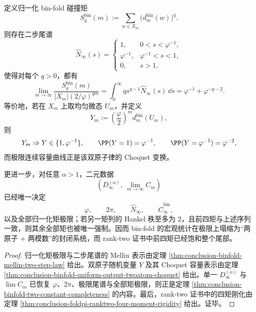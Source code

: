 \begin{theorem}\label{thm:conclusion-binfold-twoatom-macro-closure-fourmoment}
定义归一化 bin-fold 碰撞矩
\[
S_q^{\mathrm{bin}}(m):=\sum_{w\in X_m}\bigl(d_m^{\mathrm{bin}}(w)\bigr)^q.
\]
则存在二步尾谱
\[
\widehat N_\infty(s)=
\begin{cases}
1,&0<s<\varphi^{-1},\\
\varphi^{-1},&\varphi^{-1}<s<1,\\
0,&s>1,
\end{cases}
\]
使得对每个 \(q>0\)，都有
\[
\lim_{m\to\infty}\frac{S_q^{\mathrm{bin}}(m)}{|X_m|(2/\varphi)^{qm}}
=
\int_0^\infty q s^{q-1}\widehat N_\infty(s)\,\dd s
=
\varphi^{-1}+\varphi^{-q-2}.
\]
等价地，若在 \(X_m\) 上取均匀微态 \(U_m\)，并定义
\[
Y_m:=\left(\frac{\varphi}{2}\right)^m d_m^{\mathrm{bin}}(U_m),
\]
则
\[
Y_m\Rightarrow Y\in\{1,\varphi^{-1}\},
\qquad
\PP(Y=1)=\varphi^{-1},
\qquad
\PP(Y=\varphi^{-1})=\varphi^{-2},
\]
而极限连续容量曲线正是该双原子律的 Choquet 变换。

更进一步，对任意 \(\alpha>1\)，二元数据
\[
\left(D_\infty^{(\alpha)},\ \lim_{m\to\infty}C_m\right)
\]
已经唯一决定
\[
\varphi,\qquad 2\pi,\qquad \widehat N_\infty,\qquad \widehat C_\infty^{\mathrm{bin}},
\]
以及全部归一化矩极限；若另一矩列的 Hankel 秩至多为 \(2\)，且前四矩与上述序列一致，则其余全部矩也被唯一强制。因而 bin-fold 的宏观统计在极限上塌缩为“两原子 + 两模数”的封闭系统，而 rank-two 证书中前四矩已经饱和整个尾部。
\end{theorem}
\begin{proof}
归一化矩极限与二步尾谱的 Mellin 表示由定理 \ref{thm:conclusion-binfold-mellin-two-step-law} 给出。双原子随机变量 \(Y\) 及其 Choquet 容量表示由定理 \ref{thm:conclusion-binfold-uniform-output-twoatom-choquet} 给出。单一 \(D_\infty^{(\alpha)}\) 与 \(\lim C_m\) 已恢复 \(\varphi\)、\(2\pi\)、极限尾谱与全部矩极限，则正是定理 \ref{thm:conclusion-binfold-two-constant-completeness} 的内容。最后，rank-two 证书中的四矩刚化由定理 \ref{thm:conclusion-foldpi-ranktwo-four-moment-rigidity} 给出。证毕。
\end{proof}


